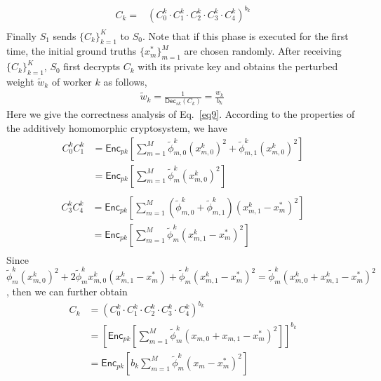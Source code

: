 \documentclass[conference]{IEEEtran}
\begin{document}
\begin{equation}
  \begin{split}
    C_k = & \left(C_0^k\cdot C_1^k\cdot C_2^k\cdot C_3^k \cdot C_4^k\right)^{b_k} \\
  \end{split}
\end{equation}
Finally $S_1$ sends $\{C_k\}_{k=1}^K$ to $S_0$.
Note that if this phase is executed for the first time, the initial ground truths $\{x_m^*\}_{m=1}^M$ are chosen randomly.
After receiving $\{C_k\}_{k=1}^K$, $S_0$ first decrypts $C_k$ with its private key and obtains the perturbed weight $\tilde{w}_k$ of worker $k$ as follows,
\begin{equation}
  \begin{split}
    \tilde{w}_k = \frac{1}{\mathsf{Dec}_{sk}\left(C_k\right)} = \frac{w_k}{b_k}
  ~\label{eq9}
  \end{split}
\end{equation}
Here we give the correctness analysis of Eq.~\ref{eq9}.
According to the properties of the additively homomorphic cryptosystem, we have
\begin{equation}
  \begin{split}
  C_0^k C_1^k & = \mathsf{Enc}_{pk}\left[\sum_{m=1}^M \tilde{\phi}_{m,0}^k\left(x_{m,0}^k\right)^2 + \tilde{\phi}_{m,1}^k\left(x_{m,0}^k\right)^2  \right] \\
   & = \mathsf{Enc}_{pk}\left[\sum_{m=1}^M \tilde{\phi}_m^k\left(x_{m,0}^k\right)^2 \right] \\
  \end{split}
\end{equation}
\begin{equation}
  \begin{split}
  C_3^kC_4^k & = \mathsf{Enc}_{pk}\left[\sum_{m=1}^M \left(\tilde{\phi}_{m,0}^k + \tilde{\phi}_{m,1}^k\right) \left(x_{m,1}^k-x_m^*\right)^2 \right] \\
  & = \mathsf{Enc}_{pk}\left[\sum_{m=1}^M \tilde{\phi}_m^k\left(x_{m,1}^k - x_m^*\right)^2\right] \\
  \end{split}
\end{equation}
Since $\tilde{\phi}_m^k (x_{m,0}^k)^2 + 2\tilde{\phi}_m^kx_{m,0}^k\left(x_{m,1}^k - x_m^*\right) + \tilde{\phi}_m^k(x_{m,1}^k - x_m^*)^2 = \tilde{\phi}_m^k (x_{m,0}^k + x_{m,1}^k - x_m^*)^2$, then we can further obtain
\begin{equation}
  \begin{split}
  C_k & = \left(C_0^k \cdot C_1^k\cdot C_2^k \cdot C_3^k \cdot C_4^k\right)^{b_k} \\
   & = \left[\mathsf{Enc}_{pk}\left[\sum_{m=1}^M \tilde{\phi}_m^k (x_{m,0} + x_{m,1} - x_m^*)^2 \right]\right]^{b_k} \\
  & = \mathsf{Enc}_{pk}\left[b_k \sum_{m=1}^M \tilde{\phi}_m^k (x_m - x_m^*)^2 \right] \\
  \end{split}
\end{equation}
\end{document}
